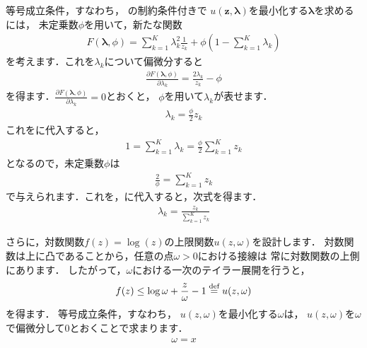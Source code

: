 等号成立条件，すなわち，
の制約条件付きで
$u(\bm{z},\bm\lambda)$を最小化する$\bm\lambda$を求めるには，
未定乗数$\phi$を用いて，新たな関数
\begin{align}
F(\bm\lambda,\phi) = \sum_{k=1}^K \lambda_k^2 \frac{1}{z_k} + \phi \left(1 - \sum_{k=1}^K \lambda_k\right)
\end{align}
を考えます．これを$\lambda_k$について偏微分すると
\begin{align}
\frac{\partial F(\bm\lambda,\phi)}{\partial\lambda_k} 
= \frac{2 \lambda_k}{z_k} - \phi
\end{align}
を得ます．$\frac{\partial F(\bm\lambda,\phi)}{\partial\lambda_k} = 0$とおくと，
$\phi$を用いて$\lambda_k$が表せます．
\begin{align}
\lambda_k = \frac{\phi}{2} z_k
\label{eqn:lambda_k_is_nmf}
\end{align}
これをに代入すると，
\begin{align}
1 = \sum_{k=1}^K \lambda_k = \frac{\phi}{2}\sum_{k=1}^K z_k
\end{align}
となるので，未定乗数$\phi$は
\begin{align}
\frac{2}{\phi} = \sum_{k=1}^K z_k
\end{align}
で与えられます．これを，に代入すると，次式を得ます．
\begin{align}
\lambda_k = \frac{z_k}{\sum_{k=1}^K z_k}
\end{align}

さらに，対数関数$f(z)=\log(z)$の上限関数$u(z,\omega)$を設計します．
対数関数は上に凸であることから，任意の点$\omega > 0$における接線は
常に対数関数の上側にあります．
したがって，$\omega$における一次のテイラー展開を行うと，
\begin{align}
f(z) \le \log \omega + \frac{z}{\omega} - 1
\overset{\mbox{\scriptsize{def}}}{=}
u(z,\omega)
\label{eqn:log_tangent_aux}
\end{align}
を得ます．
等号成立条件，すなわち，
$u(z,\omega)$を最小化する$\omega$は，
$u(z,\omega)$を$\omega$で偏微分して$0$とおくことで求まります．
\begin{align}
 \omega = x
\end{align}

